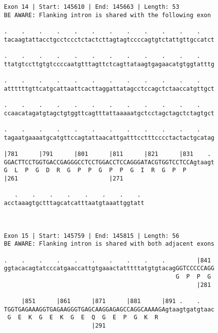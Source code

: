 \documentclass{article}
\begin{document}
\begin{Verbatim}
                                                            
 
Exon 14 | Start: 145610 | End: 145663 | Length: 53
BE AWARE: Flanking intron is shared with the following exon
 
.    .    .    .    .    .    .    .    .    .    .    .    
tacaagtattacctgcctccctctactcttagtagtccccagtgtctattgttgccatct
                                                            
.    .    .    .    .    .    .    .    .    .    .    .    
ttatgtccttgtgtccccaatgtttagttctcagttataagtgagaacatgtggtatttg
                                                            
.    .    .    .    .    .    .    .    .    .    .    .    
attttttgttcatgcattaattcacttaggattatagcctccagctctaaccatgttgct
                                                            
.    .    .    .    .    .    .    .    .    .    .    .    
ccaacatagatgtagctgtggttcagtttattaaaaatgctcctagctagctctagtgct
                                                            
.    .    .    .    .    .    .    .    .    .    .    .    
tagaatgaaaatgcatgttccagtattaacattgatttcctttcccctactactgcatag
                                                            
|781      |791      |801      |811      |821      |831    . 
GGACTTCCTGGTGACCGAGGGCCTCCTGGACCTCCAGGGATACGTGGTCCTCCAgtaagt
G  L  P  G  D  R  G  P  P  G  P  P  G  I  R  G  P  P        
|261                          |271                          
  
   .    .    .    .    .    .    .    . 
acctaaagtgctttagcatcatttaatgtaaattggtatt
                                        
                                        
 
Exon 15 | Start: 145759 | End: 145815 | Length: 56
BE AWARE: Flanking intron is shared with both adjacent exons
 
.    .    .    .    .    .    .    .    .    .         |841 
ggtacacagtatcccatgaaccattgtgaaactatttttatgtgtacagGGTCCCCCAGG
                                                 G  P  P  G 
                                                       |281 
  
     |851      |861      |871      |881      |891 .    .    
TGGTGAGAAAGGTGAGAAGGGTGAGCAAGGAGAGCCAGGCAAAAGAgtaagtgatgtaac
 G  E  K  G  E  K  G  E  Q  G  E  P  G  K  R                
                         |291                               
  

\end{Verbatim}
\end{document}
